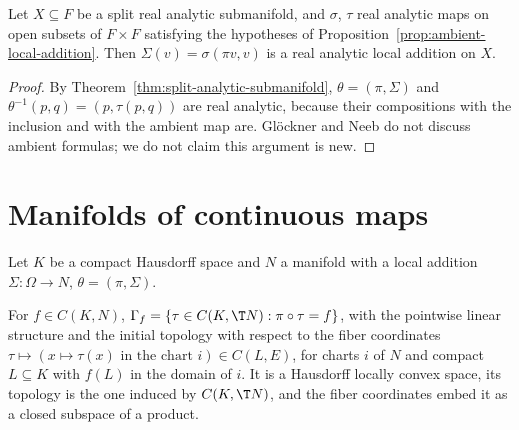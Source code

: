 \begin{proposition}
  \label{prop:analytic-ambient-local-addition}
  \leanok
  Let $X \subseteq F$ be a split real analytic submanifold, and $\sigma$, $\tau$ real analytic maps
  on open subsets of $F \times F$ satisfying the hypotheses of
  Proposition~\ref{prop:ambient-local-addition}. Then $\Sigma(v) = \sigma(\pi v, v)$ is a real
  analytic local addition on $X$.
\end{proposition}

\begin{proof}
  \leanok
  By Theorem~\ref{thm:split-analytic-submanifold}, $\theta = (\pi, \Sigma)$ and
  $\theta^{-1}(p, q) = (p, \tau(p, q))$ are real analytic, because their compositions with the
  inclusion and with the ambient map are. Glöckner and Neeb do not discuss ambient formulas; we do
  not claim this argument is new.
\end{proof}

\section{Manifolds of continuous maps}

Let $K$ be a compact Hausdorff space and $N$ a manifold with a local addition
$\Sigma \colon \Omega \to N$, $\theta = (\pi, \Sigma)$.

\begin{definition}
  \label{def:gamma-f}
  \leanok
  For $f \in C(K, N)$, $\Gamma_f = \{\tau \in C(K, \T N) : \pi \circ \tau = f\}$, with the
  pointwise linear structure and the initial topology with respect to the fiber coordinates
  $\tau \mapsto (x \mapsto \tau(x) \text{ in the chart } i) \in C(L, E)$, for charts $i$ of $N$ and
  compact $L \subseteq K$ with $f(L)$ in the domain of $i$. It is a Hausdorff locally convex space,
  its topology is the one induced by $C(K, \T N)$, and the fiber coordinates embed it as a closed
  subspace of a product.
\end{definition}

